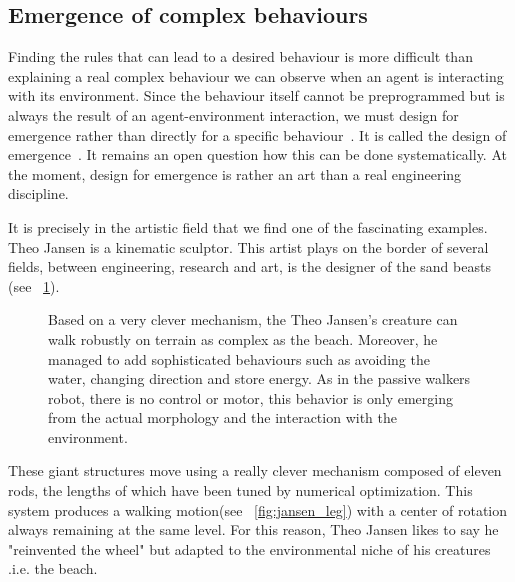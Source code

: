 \subsection{Emergence of complex behaviours} %

Finding the rules that can lead to a desired behaviour is more difficult than explaining a real complex behaviour we can observe when an agent is interacting with its environment. Since the behaviour itself cannot be preprogrammed but is always the result of an agent-environment interaction, we must design for emergence rather than directly for a specific behaviour~\parencite{Pfeifer06}. It is called the design of emergence~\parencite{Steels1991emergence}. It remains an open question how this can be done systematically. At the moment, design for emergence is rather an art than a real engineering discipline.

It is precisely in the artistic field that we find one of the fascinating examples. Theo Jansen is a kinematic sculptor. This artist plays on the border of several fields, between engineering, research and art, is the designer of the sand beasts (see \figurename~\ref{fig:theo_jansen_beast}).

\begin{figure}[tb]
\centering
    \newline
    \hfil
    \hfil
    \caption{Based on a very clever mechanism, the Theo Jansen's creature can walk robustly on terrain as complex as the beach. Moreover, he managed to add sophisticated behaviours such as avoiding the water, changing direction and store energy. As in the passive walkers robot, there is no control or motor, this behavior is only emerging from the actual morphology and the interaction with the environment.}
    \label{fig:theo_jansen_beast}
\end{figure}


These giant structures move using a really clever mechanism composed of eleven rods, the lengths of which have been tuned by numerical optimization. This system produces a walking motion(see \figurename~\ref{fig:jansen_leg}) with a center of rotation always remaining at the same level. For this reason, Theo Jansen likes to say he "reinvented the wheel" but adapted to the environmental niche of his creatures .i.e. the beach.

